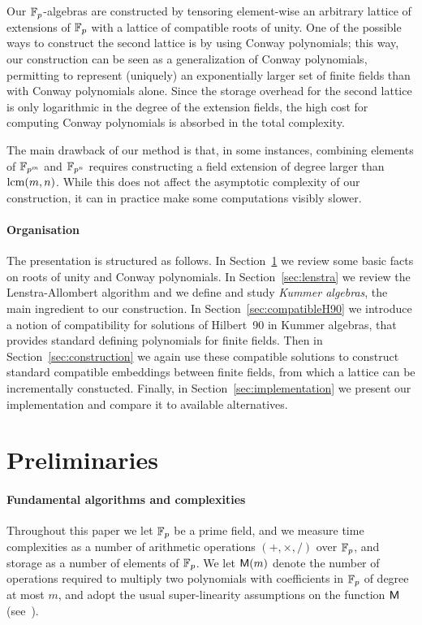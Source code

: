 \documentclass{sig-alternate}
\begin{document}
Our $\mathbb{F}_{p}$-algebras are constructed by tensoring element-wise an
arbitrary lattice of extensions of $\mathbb{F}_{p}$ with a lattice of compatible
roots of unity. %
One of the possible ways to construct the second lattice is by using
Conway polynomials; this way, our construction can be seen as a
generalization of Conway polynomials, permitting to represent
(uniquely) an exponentially larger set of finite fields than with
Conway polynomials alone. %
Since the storage overhead for the second lattice is only logarithmic
in the degree of the extension fields, the high cost for computing
Conway polynomials is absorbed in the total complexity.

The main drawback of our method is that, in some instances, combining
elements of $\mathbb{F}_{p^m}$ and $\mathbb{F}_{p^n}$ requires constructing a field
extension of degree larger than $\operatorname{lcm}(m,n)$. %
While this does not affect the asymptotic complexity of our
construction, %
it can in practice make some computations visibly slower.


\paragraph{Organisation}
The presentation is structured as follows. %
In Section~\ref{sec:conway} we review some basic facts on roots of
unity and Conway polynomials. %
In Section~\ref{sec:lenstra} we review the Lenstra-Allombert algorithm
and we define and study \emph{Kummer algebras},
the main ingredient to our construction. %
In Section~\ref{sec:compatibleH90} we introduce a notion of compatibility
for solutions of Hilbert~90 in Kummer algebras, that provides standard
defining polynomials for finite fields.
Then in Section~\ref{sec:construction} we again use these compatible solutions
to construct standard compatible embeddings between finite fields,
from which a lattice can be incrementally constucted.
Finally, in Section~\ref{sec:implementation} we present our
implementation and compare it to available alternatives.


\section{Preliminaries}
\label{sec:conway}

\paragraph{Fundamental algorithms and complexities}
Throughout this paper we let $\mathbb{F}_p$ be a prime field, and we measure
time complexities as a number of arithmetic operations $(+,\times,/)$
over $\mathbb{F}_p$, and storage as a number of elements of $\mathbb{F}_p$. %
We let $\mathsf{M}(m)$ denote the number of operations required to multiply
two polynomials with coefficients in $\mathbb{F}_p$ of degree at most $m$, and
adopt the usual super-linearity assumptions on the function $\mathsf{M}$
(see~\cite[Ch.~8.3]{vzGG}).
\end{document}
